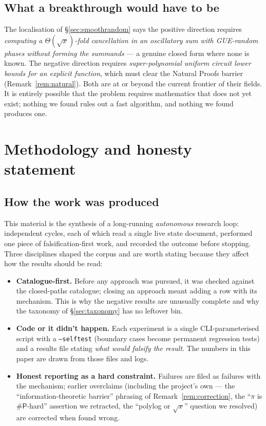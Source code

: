 \documentclass[11pt]{article}
\theoremstyle{plain}
\theoremstyle{definition}
\theoremstyle{remark}
\newcommand{\sharpP}{\#\mathsf{P}}
\begin{document}
\subsection{What a breakthrough would have to be}

The localisation of \S\ref{sec:smoothrandom} says the positive direction requires
\emph{computing a $\Theta(\sqrt{x})$-fold cancellation in an oscillatory sum with
GUE-random phases without forming the summands} --- a genuine closed form where
none is known. The negative direction requires \emph{super-polynomial uniform
circuit lower bounds for an explicit function}, which must clear the Natural Proofs
barrier (Remark~\ref{rem:natural}). Both are at or beyond the current frontier of
their fields. It is entirely possible that the problem requires mathematics that
does not yet exist; nothing we found rules out a fast algorithm, and nothing we
found produces one.

\section{Methodology and honesty statement}
\label{sec:methodology}

\subsection{How the work was produced}

This material is the synthesis of a long-running \emph{autonomous} research loop:
independent cycles, each of which read a single live state document, performed one
piece of falsification-first work, and recorded the outcome before stopping. Three
disciplines shaped the corpus and are worth stating because they affect how the
results should be read:
\begin{itemize}[leftmargin=1.4em,itemsep=2pt]
\item \textbf{Catalogue-first.} Before any approach was pursued, it was checked
against the closed-paths catalogue; closing an approach meant adding a row with
its mechanism. This is why the negative results are unusually complete and why the
taxonomy of \S\ref{sec:taxonomy} has no leftover bin.
\item \textbf{Code or it didn't happen.} Each experiment is a single
CLI-parameterised script with a \texttt{--selftest} (boundary cases become
permanent regression tests) and a results file stating \emph{what would falsify
the result}. The numbers in this paper are drawn from those files and logs.
\item \textbf{Honest reporting as a hard constraint.} Failures are filed as
failures with the mechanism; earlier overclaims (including the project's own ---
the ``information-theoretic barrier'' phrasing of Remark~\ref{rem:correction}, the
``$\pi$ is $\sharpP$-hard'' assertion we retracted, the ``polylog or $\sqrt{x}$''
question we resolved) are corrected when found wrong.
\end{itemize}
\end{document}
